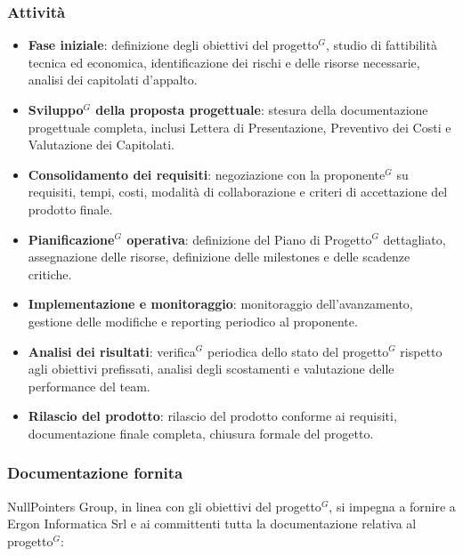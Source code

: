 	\subsubsection{Attività}
	\begin{itemize}[itemsep=3pt, parsep=1pt, label=$\scriptstyle\bullet$]
	    \item \textbf{Fase iniziale}: definizione degli obiettivi del progetto$^G$, studio di fattibilità tecnica ed economica, identificazione dei rischi e delle risorse necessarie, analisi dei capitolati d'appalto.
	    \item \textbf{Sviluppo$^G$ della proposta progettuale}: stesura della documentazione progettuale completa, inclusi Lettera di Presentazione, Preventivo dei Costi e Valutazione dei Capitolati.
	    \item \textbf{Consolidamento dei requisiti}: negoziazione con la proponente$^G$ su requisiti, tempi, costi, modalità di collaborazione e criteri di accettazione del prodotto finale.
	    \item \textbf{Pianificazione$^G$ operativa}: definizione del Piano di Progetto$^G$ dettagliato, assegnazione delle risorse, definizione delle milestones e delle scadenze critiche.
	    \item \textbf{Implementazione e monitoraggio}: monitoraggio dell’avanzamento, gestione delle modifiche e reporting periodico al proponente.
	    \item \textbf{Analisi dei risultati}: verifica$^G$ periodica dello stato del progetto$^G$ rispetto agli obiettivi prefissati, analisi degli scostamenti e valutazione delle performance del team.
	    \item \textbf{Rilascio del prodotto}: rilascio del prodotto conforme ai requisiti, documentazione finale completa, chiusura formale del progetto.
	\end{itemize}
	

	\subsubsection{Documentazione fornita}
	NullPointers Group, in linea con gli obiettivi del progetto$^G$, si impegna a fornire a Ergon Informatica Srl e ai committenti tutta la documentazione relativa al progetto$^G$:

